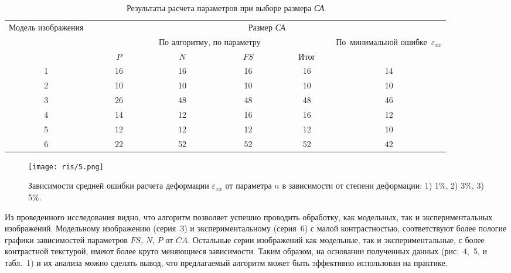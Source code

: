 \documentclass[a4paper]{jctart10}
\begin{document}
\begin{center}
\begin{table}[h]
\caption{Результаты расчета параметров при выборе размера \it{СА}}
\begin{tabular}{|c|c|c|c|c|c|}
\hline
\multirow{3}{2.5cm}{Модель изображения} & \multicolumn{5}{c|}{Размер \it{СА}}  \\
\cline{2-6}
& \multicolumn{4}{c|}{По алгоритму, по параметру}  & \multirow{2}{3.3cm}{По~минимальной ошибке~$\varepsilon_{xx}$} \\ \cline{2-5}
& {~~~~~~}$P${~~~~~~} & {~~~~~~}$N${~~~~~~} & {~~~~~~}$FS${~~~~~~} & {~~~}Итог{~~~} &    \\
\hline
1   & 16             & 16             & 16              & 16   & 14    \\
\hline
2    & 10             & 10             & 10              & 10   & 10  \\
\hline
3                                   & 26             & 48             & 48              & 48   & 46                                     \\ \hline
4                                   & 14             & 12             & 16              & 16   & 12                                     \\ \hline
5                                   & 12             & 12             & 12              & 12   & 10                                     \\ \hline
6                                   & 22             & 52             & 52              & 52   & 42                                     \\ \hline
\end{tabular}
\end{table}
\end{center}

\begin{figure}[htbp]
    \centering
    \texttt{[image: ris/5.png]}
    \caption{Зависимости средней ошибки расчета деформации $\varepsilon_{xx}$ от параметра $n$ в зависимости от степени деформации: 1) 1\%, 2) 3\%, 3) 5\%.}
\end{figure}

Из проведенного исследования видно, что алгоритм позволяет успешно проводить обработку, как модельных, так и экспериментальных изображений. Модельному изображению (серия~3) и экспериментальному (серия~6) с малой контрастностью, соответствуют более пологие графики зависимостей параметров $FS$, $N$, $P$ от $CA$. Остальные серии изображений как модельные, так и экспериментальные, с более контрастной текстурой, имеют более круто меняющиеся зависимости. Таким образом, на основании полученных данных (рис.~4,~5, и табл.~1) и их анализа можно сделать вывод, что предлагаемый алгоритм может быть эффективно использован на практике.
\end{document}
